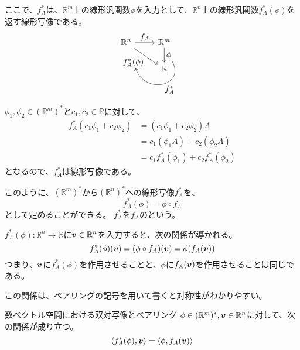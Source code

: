 \documentclass[../../../topic_linear-algebra]{subfiles}
\begin{document}
ここで、$f_{A}^*$は、$\mathbb{R}^m$上の線形汎関数$\phi$を入力として、$\mathbb{R}^n$上の線形汎関数$f_A^*(\phi)$を返す線形写像である。
\begin{equation*}
  \begin{tikzcd}[every label/.append style = {font = \normalsize}]
    \mathbb{R}^n \arrow[r,"f_A"]\arrow[rd, "f_A^*(\phi)"'{name=v}] & \mathbb{R}^m \arrow[d,"\phi"{name=w}] \arrow[from=w,to=v,out=-60, in=-70,looseness=2,"f_A^*"]\\
    & \mathbb{R}
  \end{tikzcd}
\end{equation*}

\begin{handout}[補足：$f_A^*$の線形性]
  $\phi_1, \phi_2 \in (\mathbb{R}^m)^*$と$c_1, c_2 \in \mathbb{R}$に対して、
  \begin{align*}
    f_A^*(c_1 \phi_1 + c_2 \phi_2) &= (c_1 \phi_1 + c_2 \phi_2) A \\
    &= c_1 (\phi_1 A) + c_2 (\phi_2 A) \\
    &= c_1 f_A^*(\phi_1) + c_2 f_A^*(\phi_2)
  \end{align*}
  となるので、$f_A^*$は線形写像である。
\end{handout}

このように、$(\mathbb{R}^m)^*$から$(\mathbb{R}^n)^*$への線形写像$f_A^*$を、
\begin{equation*}
  f_A^*(\phi) = \phi \circ f_A
\end{equation*}
として定めることができる。
$f_A^*$を$f_A$のという。

\br

$f_A^*(\phi)\colon \mathbb{R}^n \to \mathbb{R}$に$\vb*{v} \in \mathbb{R}^n$を入力すると、次の関係が導かれる。
\begin{equation*}
  f_A^*(\phi)(\vb*{v}) = (\phi \circ f_A)(\vb*{v}) = \phi(f_A(\vb*{v}))
\end{equation*}
つまり、$\vb*{v}$に$f_A^*(\phi)$を作用させることと、$\phi$に$f_A(\vb*{v})$を作用させることは同じである。

\br

この関係は、ペアリングの記号を用いて書くと対称性がわかりやすい。

\begin{theorem*}{数ベクトル空間における双対写像とペアリング}
  $\phi \in (\mathbb{R}^m)^*, \vb*{v} \in \mathbb{R}^n$に対して、次の関係が成り立つ。
  \begin{equation*}
    \langle f_A^*(\phi), \vb*{v} \rangle = \langle \phi, f_A(\vb*{v}) \rangle
  \end{equation*}
\end{theorem*}
\end{document}
